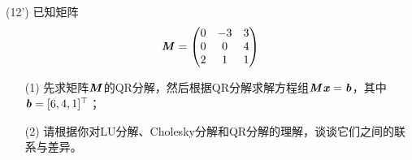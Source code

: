\documentclass[12pt,a4paper,openany,twoside]{ctexbook}
\begin{document}
\begin{exercise}(12')
	已知矩阵\[ \boldsymbol{\mathit{M}} = \begin{pmatrix}
		0&-3&3\\0&0&4\\2&1&1
	\end{pmatrix}
	\]
	
	\begin{itemize}
		\item [(1)] 先求矩阵$\boldsymbol{\mathit{M}}$的QR分解，然后根据QR分解求解方程组$\boldsymbol{\mathit{M}} \boldsymbol{\mathit{x}} = \boldsymbol{\mathit{b}}$，其中$\boldsymbol{\mathit{b}}=[6, 4, 1]^\top$；
		\item [(2)] 请根据你对LU分解、Cholesky分解和QR分解的理解，谈谈它们之间的联系与差异。
	\end{itemize}
	
\end{exercise}
\end{document}
